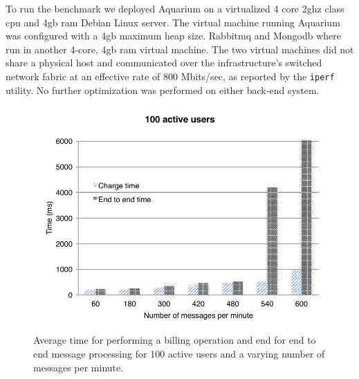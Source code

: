 \documentclass[letterpaper,twocolumn,10pt]{article}
\begin{document}
To run the benchmark we deployed Aquarium on a virtualized 4 core
2{\sc gh}z class {\sc cpu} and 4{\sc gb} {\sc ram} Debian Linux server.
The virtual machine running Aquarium was configured with a 4{\sc gb}
maximum heap size. Rabbit{\sc mq} and Mongo{\sc db} where run in
another 4-core, 4{\sc gb ram} virtual machine. The two virtual
machines did not share a physical host and communicated over the
infrastructure's switched network fabric at an effective rate of 800
Mbits/sec, as reported by the \texttt{iperf} utility. No further
optimization was performed on either back-end system.

\begin{figure}[t]
    \begin{center}
        \includegraphics[scale=0.59]{perf.pdf}
    \end{center}

    \caption{Average time for performing a billing operation and end
      for end to end message processing for 100 active users and a
      varying number of messages per minute.}
    
    \label{fig:perf}
\end{figure}
\end{document}
